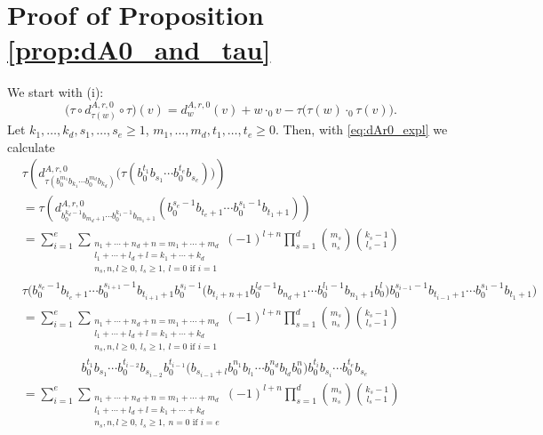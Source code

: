 \documentclass[12pt,reqno]{amsart}
\numberwithin{equation}{section}
\theoremstyle{definition}
\newcommand{\derrzero}[1]{d_{#1}^{A,r,0}}
\newcommand{\conczero}{\cdot_0}
\begin{document}
\appendix

\section{Proof of Proposition \ref{prop:dA0_and_tau}} \label{ap:proof_prop_dA0_and_tau}

We start with (i):
\[\big(\tau\circ \derrzero{\tau(w)}\circ \tau\big)(v)= \derrzero{w}(v)+w \conczero v-\tau\big(\tau(w)\conczero\tau(v)\big).\]
Let $k_1,\ldots,k_d,s_1,\ldots,s_e\geq1$, $m_1,\ldots,m_d,t_1,\ldots,t_e\geq0$. Then, with \eqref{eq:dAr0_expl} we calculate
\begin{align}  \label{eq:dAr0}
&\tau\left(\derrzero{\tau(b_0^{m_1}b_{k_1}\cdots b_0^{m_d}b_{k_d})}\big(\tau(b_0^{t_1}b_{s_1}\cdots b_0^{t_e}b_{s_e})\big)\right) \nonumber\\
&=\tau\left(\derrzero{b_0^{k_d-1}b_{m_d+1}\cdots b_0^{k_1-1}b_{m_1+1}}(b_0^{s_e-1}b_{t_e+1}\cdots b_0^{s_1-1}b_{t_1+1})\right) \nonumber\\
&= \sum_{i=1}^e \sum_{\substack{n_1+\cdots+n_d+n=m_1+\cdots+m_d \\ l_1+\cdots+l_d+l=k_1+\cdots+k_d \\ n_s,n,l\geq0,\ l_s\geq1,\ l=0 \text{ if } i=1}} (-1)^{l+n} \prod_{s=1}^d \binom{m_s}{n_s}\binom{k_s-1}{l_s-1} \nonumber\\
&\tau\big(b_0^{s_e-1}b_{t_e+1}\cdots b_0^{s_{i+1}-1}b_{t_{i+1}+1}b_0^{s_i-1}\big(b_{t_i+n+1}b_0^{l_d-1}b_{n_d+1}\cdots b_0^{l_1-1}b_{n_1+1}b_0^l\big)b_0^{s_{i-1}-1}b_{t_{i-1}+1}\cdots b_0^{s_1-1}b_{t_1+1}\big) \nonumber\\
&=\sum_{i=1}^e \sum_{\substack{n_1+\cdots+n_d+n=m_1+\cdots+m_d \\ l_1+\cdots+l_d+l=k_1+\cdots+k_d \\ n_s,n,l\geq0,\ l_s\geq1,\ l=0 \text{ if } i=1}} (-1)^{l+n} \prod_{s=1}^d \binom{m_s}{n_s}\binom{k_s-1}{l_s-1} \nonumber \\
&\hspace{2cm}b_0^{t_1}b_{s_1}\cdots b_0^{t_{i-2}}b_{s_{i-2}}b_0^{t_{i-1}}\big(b_{s_{i-1}+l}b_0^{n_1}b_{l_1}\cdots b_0^{n_d}b_{l_d}b_0^n\big)b_0^{t_i}b_{s_i}\cdots b_0^{t_e}b_{s_e} \nonumber \\
&=\sum_{i=1}^e \sum_{\substack{n_1+\cdots+n_d+n=m_1+\cdots+m_d \\ l_1+\cdots+l_d+l=k_1+\cdots+k_d \\ n_s,n,l\geq0,\ l_s\geq1,\ n=0 \text{ if } i=e}} (-1)^{l+n} \prod_{s=1}^d \binom{m_s}{n_s}\binom{k_s-1}{l_s-1} \nonumber \\

\end{align}
\end{document}

